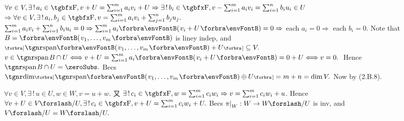 $\forall v\in V,\exists\,!\,a_i\in\Fbb,v+U=\sum_{i=1}^m a_i v_i+U\Rightarrow\exists\,!\,b_i\in\Fbb,v-\sum_{i=1}^m a_i v_i=\sum_{i=1}^n b_i u_i\in U$\parSol{\vspace{2pt}}
$\Rightarrow \forall v\in V,\exists\,!\,a_i,b_j\in\Fbb,v=\sum_{i=1}^m a_i v_i+\sum_{j=1}^n b_j u_j.$\PfEnd\parSol{\vspace{6pt}}
\Or $\sum_{i=1}^m a_i v_i+\sum_{i=1}^n b_i u_i=0\Rightarrow\sum_{i=1}^m a_i\Par{v_i+U}=0\Rightarrow$ each $a_i=0\Rightarrow$ each $b_i=0.$\PfEnd\parSol{\vspace{6pt}}
\Or Note that $B=\Par{v_1,\dots,v_m}$ is liney indep, and $\Sbra{\Span{v_1,\dots,v_m}+U}\subseteq V.$\parSol{}
$v\in\spn B\cap U\Longleftrightarrow v+U=\sum_{i=1}^ma_i\Par{v_i+U}=0+U\Longleftrightarrow v=0.$ \,Hence $\spn B\cap U=\zeroSubs.$\parSol{}
Becs $\Dim\Sbra{\Span{v_1,\dots,v_m}\oplus U}=m+n=\dim V.$ \;Now by (2.B.8).\PfEnd
\SepLine

$\forall v\in V,\exists\,!\,u\in U,w\in W,v=u+w.$ 又 $\exists\,!\,c_i\in\Fbb,w=\sum_{i=1}^m c_i w_i\Rightarrow v=\sum_{i=1}^m c_i w_i+u$.\parSol{}
Hence $\forall v+U\in V\XSlash U,\exists\,!\,c_i\in\Fbb,v+U=\sum_{i=1}^m c_i w_i+U.$\PfEnd\vspace{2pt}\parSol{}
\Or Becs $\pi\mmid_W:W\rightarrow W\XSlash U$ is inv, and $V\XSlash U=W\XSlash U.$\PfEnd
\SepLine

\def\Pure{{\textup{\tgnr Pure}}\,}


